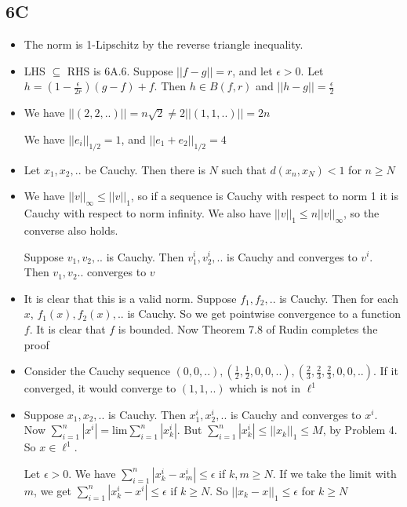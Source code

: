 \documentclass{article}
\begin{document}
\subsection*{6C}

\begin{itemize}
    \item [1] The norm is 1-Lipschitz by the reverse triangle inequality.
    \item[2] LHS $\subseteq$ RHS is 6A.6. Suppose $||f-g||=r$, and let $\epsilon>0$. Let $h=(1-\frac{\epsilon}{2r})(g-f)+f$. Then $h \in B(f,r)$ and $||h-g||=\frac{\epsilon}{2}$
    
    \item[3] We have $||(2,2,..)||=n\sqrt{2}\neq 2||(1,1,..)||=2n$

    We have $||e_i||_{1/2}=1$, and $||e_1+e_2||_{1/2}=4$
    
    \item[4] Let $x_1,x_2,..$ be Cauchy. Then there is $N$ such that $d(x_n,x_N)<1$ for $n \geq N$
    \item[5] We have $||v||_\infty\leq||v||_1$, so if a sequence is Cauchy with respect to norm 1 it is Cauchy with respect to norm infinity. We also have $||v||_1\leq n||v||_\infty$, so the converse also holds.

    Suppose $v_1,v_2,..$ is Cauchy. Then $v_1^i,v_2^i,..$ is Cauchy and converges to $v^i$. Then $v_1,v_2..$ converges to $v$

    \item[6] It is clear that this is a valid norm. Suppose $f_1,f_2,..$ is Cauchy. Then for each $x$, $f_1(x),f_2(x),..$ is Cauchy. So we get pointwise convergence to a function $f$. It is clear that $f$ is bounded. Now Theorem 7.8 of Rudin completes the proof

    \item[7] Consider the Cauchy sequence $(0,0,..),(\frac{1}{2},\frac{1}{2},0,0,..),(\frac{2}{3},\frac{2}{3},\frac{2}{3},0,0,..)$. If it converged, it would converge to $(1,1,..)$ which is not in $\ell^1$

    \item[8] Suppose $x_1,x_2,..$ is Cauchy. Then $x_1^i,x_2^i,..$ is Cauchy and converges to $x^i$. Now $\sum_{i=1}^n|x^i|=\text{lim}\sum_{i=1}^n|x_k^i|$. But $\sum_{i=1}^n|x_k^i|\leq ||x_k||_1\leq M$, by Problem 4. So $x \in \ell^1$. 

    Let $\epsilon>0$. We have $\sum_{i=1}^n|x_k^i-x_m^i|\leq\epsilon$ if $k,m \geq N$. If we take the limit with $m$, we get $\sum_{i=1}^n|x_k^i-x^i|\leq \epsilon$ if $k\geq N$. So $||x_k-x||_1 \leq \epsilon$ for $k \geq N$


\end{itemize}
\end{document}
